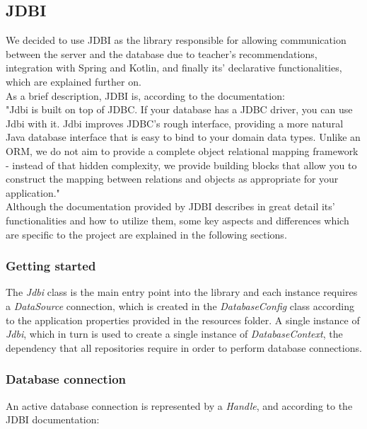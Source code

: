 \subsection{JDBI}

We decided to use JDBI as the library responsible for allowing communication between the server and the database due to teacher's
recommendations, integration with Spring and Kotlin, and finally its' declarative functionalities, which are explained further on.\\

As a brief description, JDBI is, according to the documentation:\\

"Jdbi is built on top of JDBC. If your database has a JDBC driver, you can use Jdbi with it.
Jdbi improves JDBC’s rough interface, providing a more natural Java database interface that is easy to bind to your domain data types.
Unlike an ORM, we do not aim to provide a complete object relational mapping framework - instead of that hidden complexity, we provide
building blocks that allow you to construct the mapping between relations and objects as appropriate for your application."\\

Although the documentation provided by JDBI describes in great detail its' functionalities and how to utilize them,
some key aspects and differences which are specific to the project are explained in the following sections.\\

\subsubsection{Getting started}

The \textit{Jdbi} class is the main entry point into the library and each instance requires a \textit{DataSource} connection,
which is created in the \textit{DatabaseConfig} class according to the application properties provided in the resources folder.
A single instance of \textit{Jdbi}, which in turn is used to create a single instance of \textit{DatabaseContext}, the dependency that all
repositories require in order to perform database connections. 

\subsubsection{Database connection}

An active database connection is represented by a \textit{Handle}, and according to the JDBI documentation:\\

